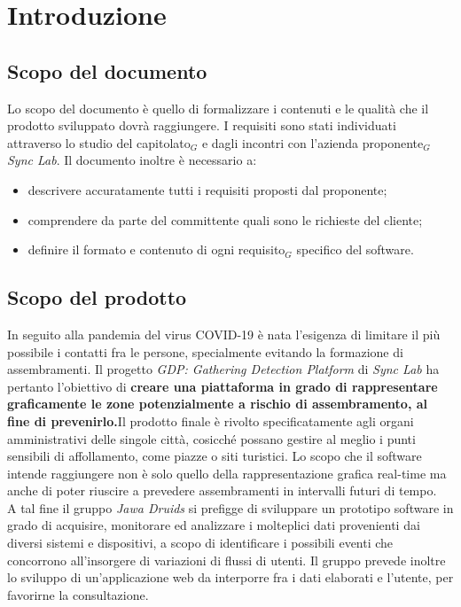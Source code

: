 \chapter{Introduzione}\label{Introduzione}

\section{Scopo del documento}\label{introduzioneScopoDelDocumento}
Lo scopo del documento è quello di formalizzare i contenuti e le qualità che il prodotto sviluppato dovrà raggiungere. 
I requisiti sono stati individuati attraverso lo studio del capitolato$_G$ e dagli incontri con l'azienda proponente$_G$ \textit{Sync Lab}. 
Il documento inoltre è necessario a:
\begin{itemize}
	\item descrivere accuratamente tutti i requisiti proposti dal proponente;
	\item comprendere da parte del committente quali sono le richieste del cliente;
	\item definire il formato e contenuto di ogni requisito$_G$ specifico del software.
\end{itemize} 
\section{Scopo del prodotto}\label{introduzioneScopodelProdotto}
In seguito alla pandemia del virus COVID-19 è nata l'esigenza di limitare il più possibile i
contatti fra le persone, specialmente evitando la formazione di assembramenti. 
Il progetto \textit{GDP: Gathering Detection Platform} di \textit{Sync Lab} ha pertanto l'obiettivo di \textbf{creare una piattaforma in grado di rappresentare graficamente le zone potenzialmente a rischio di assembramento, al fine di prevenirlo.}Il prodotto finale è rivolto specificatamente agli
organi amministrativi delle singole città, cosicché possano gestire al meglio i punti sensibili di
affollamento, come piazze o siti turistici. Lo scopo che il software intende raggiungere non è
solo quello della rappresentazione grafica real-time ma anche di poter riuscire a prevedere
assembramenti in intervalli futuri di tempo.
\\
A tal fine il gruppo \textit{Jawa Druids} si prefigge di sviluppare un prototipo software in grado di acquisire, monitorare ed analizzare i molteplici dati provenienti dai diversi sistemi e dispositivi, a scopo di identificare i possibili eventi che concorrono all'insorgere di variazioni di flussi di utenti. Il gruppo prevede inoltre lo sviluppo di un'applicazione web da interporre fra i dati elaborati e l'utente, per favorirne la consultazione.
